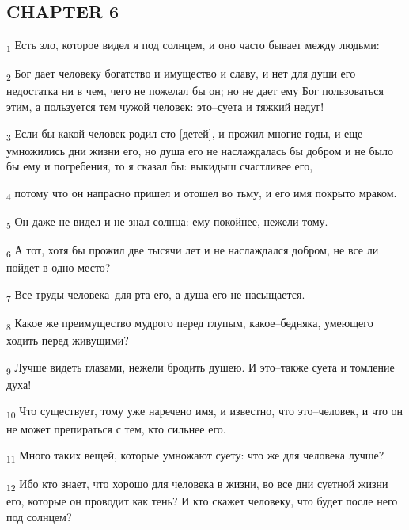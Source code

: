 \subsection{CHAPTER 6}
\begin{tcolorbox}
\textsubscript{1} Есть зло, которое видел я под солнцем, и оно часто бывает между людьми:
\end{tcolorbox}
\begin{tcolorbox}
\textsubscript{2} Бог дает человеку богатство и имущество и славу, и нет для души его недостатка ни в чем, чего не пожелал бы он; но не дает ему Бог пользоваться этим, а пользуется тем чужой человек: это--суета и тяжкий недуг!
\end{tcolorbox}
\begin{tcolorbox}
\textsubscript{3} Если бы какой человек родил сто [детей], и прожил многие годы, и еще умножились дни жизни его, но душа его не наслаждалась бы добром и не было бы ему и погребения, то я сказал бы: выкидыш счастливее его,
\end{tcolorbox}
\begin{tcolorbox}
\textsubscript{4} потому что он напрасно пришел и отошел во тьму, и его имя покрыто мраком.
\end{tcolorbox}
\begin{tcolorbox}
\textsubscript{5} Он даже не видел и не знал солнца: ему покойнее, нежели тому.
\end{tcolorbox}
\begin{tcolorbox}
\textsubscript{6} А тот, хотя бы прожил две тысячи лет и не наслаждался добром, не все ли пойдет в одно место?
\end{tcolorbox}
\begin{tcolorbox}
\textsubscript{7} Все труды человека--для рта его, а душа его не насыщается.
\end{tcolorbox}
\begin{tcolorbox}
\textsubscript{8} Какое же преимущество мудрого перед глупым, какое--бедняка, умеющего ходить перед живущими?
\end{tcolorbox}
\begin{tcolorbox}
\textsubscript{9} Лучше видеть глазами, нежели бродить душею. И это--также суета и томление духа!
\end{tcolorbox}
\begin{tcolorbox}
\textsubscript{10} Что существует, тому уже наречено имя, и известно, что это--человек, и что он не может препираться с тем, кто сильнее его.
\end{tcolorbox}
\begin{tcolorbox}
\textsubscript{11} Много таких вещей, которые умножают суету: что же для человека лучше?
\end{tcolorbox}
\begin{tcolorbox}
\textsubscript{12} Ибо кто знает, что хорошо для человека в жизни, во все дни суетной жизни его, которые он проводит как тень? И кто скажет человеку, что будет после него под солнцем?
\end{tcolorbox}

